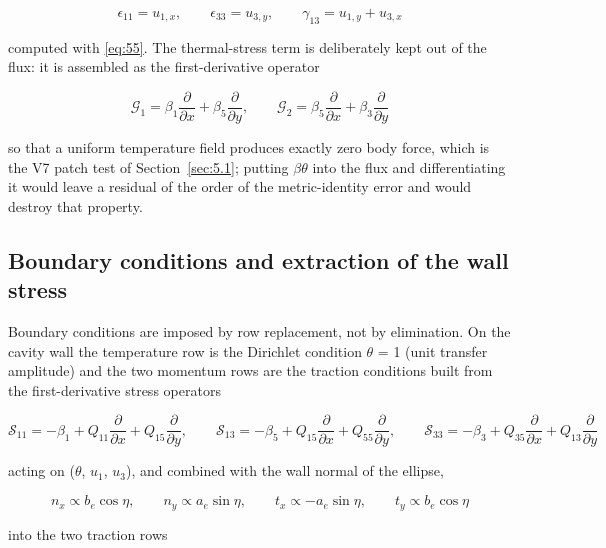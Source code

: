 \documentclass[preprint,12pt]{elsarticle}
\begin{document}
\begin{equation}
\epsilon_{11}=u_{1,x},\qquad \epsilon_{33}=u_{3,y},\qquad \gamma_{13}=u_{1,y}+u_{3,x} 
\label{eq:62}
\end{equation}

computed with \eqref{eq:55}. The thermal-stress term is deliberately kept out of the flux: it is assembled as the first-derivative operator

\begin{equation}
\mathcal{G}_1=\beta_1\frac{\partial}{\partial x}+\beta_5\frac{\partial}{\partial y},\qquad \mathcal{G}_2=\beta_5\frac{\partial}{\partial x}+\beta_3\frac{\partial}{\partial y} 
\label{eq:63}
\end{equation}

so that a uniform temperature field produces exactly zero body force, which is the V7 patch test of Section~\ref{sec:5.1}; putting $\beta \theta$ into the flux and differentiating it would leave a residual of the order of the metric-identity error and would destroy that property.

\subsection{Boundary conditions and extraction of the wall stress}
\label{sec:4.4}

Boundary conditions are imposed by row replacement, not by elimination. On the cavity wall the temperature row is the Dirichlet condition $\theta$ = 1 (unit transfer amplitude) and the two momentum rows are the traction conditions built from the first-derivative stress operators

\begin{equation}
\mathcal{S}_{11}=-\beta_1+Q_{11}\frac{\partial}{\partial x}+Q_{15}\frac{\partial}{\partial y},\qquad \mathcal{S}_{13}=-\beta_5+Q_{15}\frac{\partial}{\partial x}+Q_{55}\frac{\partial}{\partial y},\qquad \mathcal{S}_{33}=-\beta_3+Q_{35}\frac{\partial}{\partial x}+Q_{13}\frac{\partial}{\partial y} 
\label{eq:64}
\end{equation}

acting on ($\theta$, $u_{1}$, $u_{3}$), and combined with the wall normal of the ellipse,

\begin{equation}
n_x\propto b_e\cos\eta,\qquad n_y\propto a_e\sin\eta,\qquad t_x\propto-a_e\sin\eta,\qquad t_y\propto b_e\cos\eta 
\label{eq:65}
\end{equation}

into the two traction rows
\end{document}
